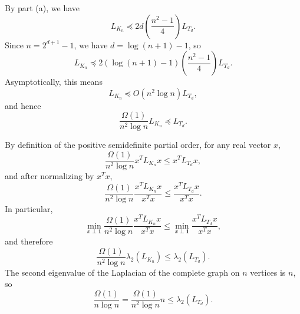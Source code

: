 \documentclass{article}
\newcommand{\1}{\mathbf{1}}
\newcommand{\0}{\mathbf{0}}
\begin{document}
\begin{enumerate}
\begin{enumerate}
    By part (a), we have
    \begin{equation*}
      L_{K_n} \preceq 2d \left(\frac{n^2 - 1}{4}\right) L_{T_d}.
    \end{equation*}
    Since $n = 2^{d + 1} - 1$, we have $d = \log(n + 1) - 1$, so
    \begin{equation*}
      L_{K_n} \preceq 2 (\log(n + 1) - 1) \left(\frac{n^2 - 1}{4}\right) L_{T_d}.
    \end{equation*}
    Asymptotically, this means
    \begin{equation*}
      L_{K_n} \preceq O(n^2 \log n) L_{T_d},
    \end{equation*}
    and hence
    \begin{equation*}
      \frac{\Omega(1)}{n^2 \log n} L_{K_n} \preceq L_{T_d}.
    \end{equation*}

    By definition of the positive semidefinite partial order, for any real vector $x$,
    \begin{equation*}
      \frac{\Omega(1)}{n^2 \log n} x^T L_{K_n} x \leq x^T L_{T_d} x,
    \end{equation*}
    and after normalizing by $x^T x$,
    \begin{equation*}
      \frac{\Omega(1)}{n^2 \log n} \frac{x^T L_{K_n} x}{x^T x} \leq \frac{x^T L_{T_d} x}{x^T x}.
    \end{equation*}
    In particular,
    \begin{equation*}
      \min_{x \perp \1} \frac{\Omega(1)}{n^2 \log n} \frac{x^T L_{K_n} x}{x^T x} \leq \min_{x \perp \1} \frac{x^T L_{T_d} x}{x^T x},
    \end{equation*}
    and therefore
    \begin{equation*}
      \frac{\Omega(1)}{n^2 \log n} \lambda_2(L_{K_n}) \leq \lambda_2(L_{T_d}).
    \end{equation*}
    The second eigenvalue of the Laplacian of the complete graph on $n$ vertices is $n$, so
    \begin{equation*}
      \frac{\Omega(1)}{n \log n} = \frac{\Omega(1)}{n^2 \log n} n \leq \lambda_2(L_{T_d}).
    \end{equation*}
  \end{enumerate}
\end{enumerate}

\end{document}
